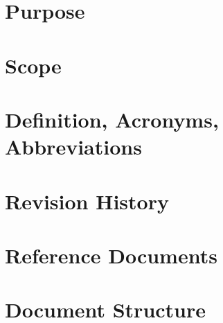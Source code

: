 \section{Purpose}
\label{sec:purpose}%

\section{Scope}
\label{sec:scope}%

\section{Definition, Acronyms, Abbreviations}
\label{sec:definition_acronyms_abbreviations}%

\section{Revision History}
\label{sec:revision_history}%

\section{Reference Documents}
\label{sec:reference_documents}%

\section{Document Structure}
\label{sec:doc_structure}%